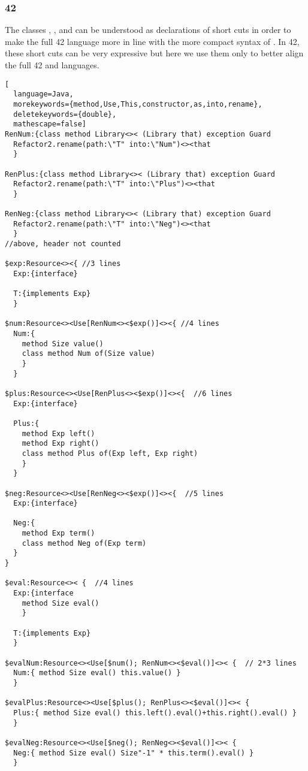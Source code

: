 \subsubsection{42}
The classes \Q@RenNum@, \Q@RenPlus@, and \Q@RenNeg@
can be understood as declarations of short cuts
in order to make the full 42 language more in line with the more compact syntax of \name.
In 42, these short cuts can be very expressive 
but here we use them only to better align the full 42 and \name languages.
\begin{lstlisting}[
  language=Java,
  morekeywords={method,Use,This,constructor,as,into,rename},
  deletekeywords={double},
  mathescape=false]
RenNum:{class method Library<>< (Library that) exception Guard
  Refactor2.rename(path:\"T" into:\"Num")<><that
  }

RenPlus:{class method Library<>< (Library that) exception Guard
  Refactor2.rename(path:\"T" into:\"Plus")<><that
  }

RenNeg:{class method Library<>< (Library that) exception Guard
  Refactor2.rename(path:\"T" into:\"Neg")<><that
  }
//above, header not counted

$exp:Resource<><{ //3 lines
  Exp:{interface}

  T:{implements Exp}
  }

$num:Resource<><Use[RenNum<><$exp()]<><{ //4 lines
  Num:{
    method Size value()
    class method Num of(Size value)
    }
  }

$plus:Resource<><Use[RenPlus<><$exp()]<><{  //6 lines
  Exp:{interface}

  Plus:{
    method Exp left()
    method Exp right()
    class method Plus of(Exp left, Exp right)
    }
  }

$neg:Resource<><Use[RenNeg<><$exp()]<><{  //5 lines
  Exp:{interface}

  Neg:{
    method Exp term()
    class method Neg of(Exp term)
  }
}

$eval:Resource<>< {  //4 lines
  Exp:{interface
    method Size eval()
    }

  T:{implements Exp}
  }

$evalNum:Resource<><Use[$num(); RenNum<><$eval()]<>< {  // 2*3 lines
  Num:{ method Size eval() this.value() }
  }

$evalPlus:Resource<><Use[$plus(); RenPlus<><$eval()]<>< {
  Plus:{ method Size eval() this.left().eval()+this.right().eval() }
  }

$evalNeg:Resource<><Use[$neg(); RenNeg<><$eval()]<>< {
  Neg:{ method Size eval() Size"-1" * this.term().eval() }
  }


\end{lstlisting}
